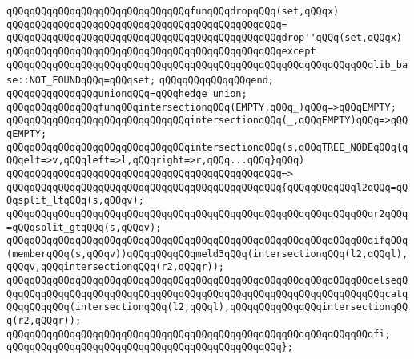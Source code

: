 \verb|qQQqqQQqqQQqqQQqqQQqqQQqqQQqqQQqfunqQQqdropqQQq(set,qQQqx)|\newline
\verb|qQQqqQQqqQQqqQQqqQQqqQQqqQQqqQQqqQQqqQQqqQQqqQQq=|\newline
\verb|qQQqqQQqqQQqqQQqqQQqqQQqqQQqqQQqqQQqqQQqqQQqqQQqdrop''qQQq(set,qQQqx)|\newline
\verb|qQQqqQQqqQQqqQQqqQQqqQQqqQQqqQQqqQQqqQQqqQQqqQQqexcept|\newline
\verb|qQQqqQQqqQQqqQQqqQQqqQQqqQQqqQQqqQQqqQQqqQQqqQQqqQQqqQQqqQQqqQQqlib_base::NOT_FOUNDqQQq=qQQqset;|\newline
\verb|qQQqqQQqqQQqqQQqend;|\newline
\newline
\verb|qQQqqQQqqQQqqQQqunionqQQq=qQQqhedge_union;|\newline
\newline
\newline
\verb|qQQqqQQqqQQqqQQqfunqQQqintersectionqQQq(EMPTY,qQQq_)qQQq=>qQQqEMPTY;|\newline
\verb|qQQqqQQqqQQqqQQqqQQqqQQqqQQqqQQqintersectionqQQq(_,qQQqEMPTY)qQQq=>qQQqEMPTY;|\newline
\newline
\verb|qQQqqQQqqQQqqQQqqQQqqQQqqQQqqQQqintersectionqQQq(s,qQQqTREE_NODEqQQq{qQQqelt=>v,qQQqleft=>l,qQQqright=>r,qQQq...qQQq}qQQq)|\newline
\verb|qQQqqQQqqQQqqQQqqQQqqQQqqQQqqQQqqQQqqQQqqQQqqQQq=>|\newline
\verb|qQQqqQQqqQQqqQQqqQQqqQQqqQQqqQQqqQQqqQQqqQQqqQQq{qQQqqQQqqQQql2qQQq=qQQqsplit_ltqQQq(s,qQQqv);|\newline
\verb|qQQqqQQqqQQqqQQqqQQqqQQqqQQqqQQqqQQqqQQqqQQqqQQqqQQqqQQqqQQqqQQqr2qQQq=qQQqsplit_gtqQQq(s,qQQqv);|\newline
\newline
\verb|qQQqqQQqqQQqqQQqqQQqqQQqqQQqqQQqqQQqqQQqqQQqqQQqqQQqqQQqqQQqqQQqifqQQq(memberqQQq(s,qQQqv))qQQqqQQqqQQqmeld3qQQq(intersectionqQQq(l2,qQQql),qQQqv,qQQqintersectionqQQq(r2,qQQqr));|\newline
\verb|qQQqqQQqqQQqqQQqqQQqqQQqqQQqqQQqqQQqqQQqqQQqqQQqqQQqqQQqqQQqqQQqelseqQQqqQQqqQQqqQQqqQQqqQQqqQQqqQQqqQQqqQQqqQQqqQQqqQQqqQQqqQQqqQQqqQQqcatqQQqqQQqqQQq(intersectionqQQq(l2,qQQql),qQQqqQQqqQQqqQQqintersectionqQQq(r2,qQQqr));|\newline
\verb|qQQqqQQqqQQqqQQqqQQqqQQqqQQqqQQqqQQqqQQqqQQqqQQqqQQqqQQqqQQqqQQqfi;|\newline
\verb|qQQqqQQqqQQqqQQqqQQqqQQqqQQqqQQqqQQqqQQqqQQqqQQq};|\newline
